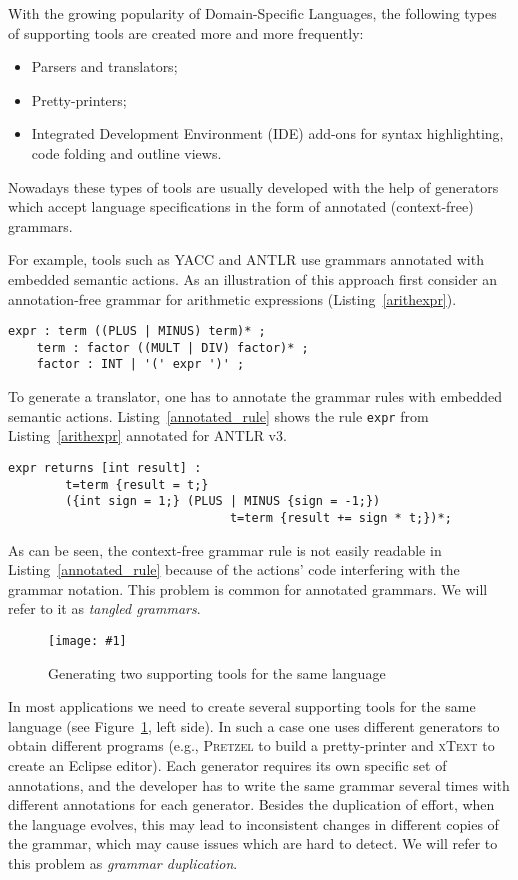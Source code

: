 \documentclass{IOS-Book-Article}     %
\newcommand{\bad}[1]{\textcolor{red}{#1}}
\renewcommand{\bad}[1]{#1}
\newcommand{\fig}[2]{%
\begin{figure}%
\centering%
\texttt{[image: \#1]}%
\caption{#2}\label{#1}%
\end{figure}%
}
\newcommand{\lstref}[1]{Listing~\ref{#1}}
\newcommand{\figref}[1]{Figure~\ref{#1}}
\newcommand{\tool}[1]{\textsc{#1}}
\begin{document}
With the growing popularity of Domain-Specific Languages, the following types of supporting tools are created \bad{more and} more frequently:
\begin{itemize}
	\item Parsers and translators;
	\item Pretty-printers;
	\item Integrated Development Environment (IDE) add-ons for syntax highlighting, code folding and outline views.
\end{itemize}
Nowadays these types of tools are usually developed with the help of generators which accept language specifications in the form of annotated (context-free) grammars. 

For example, tools such as \tool{YACC} \cite{YACC} and \tool{ANTLR} \cite{ANTLR} use grammars annotated with embedded semantic actions. As an illustration of this approach first consider an annotation-free grammar for arithmetic expressions (\lstref{arithexpr}).
\begin{lstlisting}[language=Grammatic,label=arithexpr,caption=Grammar for arithmetic expressions,float]
    expr : term ((PLUS | MINUS) term)* ;
    term : factor ((MULT | DIV) factor)* ;
    factor : INT | '(' expr ')' ;
\end{lstlisting}
To generate a translator, one has to annotate the grammar rules with embedded semantic actions. \lstref{annotated_rule} shows the rule \texttt{expr} from \lstref{arithexpr} annotated for \tool{ANTLR} v3.
\begin{lstlisting}[caption=Annotated grammar rule,label=annotated_rule,float]
    expr returns [int result] : 
        t=term {result = t;} 
        ({int sign = 1;} (PLUS | MINUS {sign = -1;}) 
                               t=term {result += sign * t;})*;
\end{lstlisting}

As can be seen, the context-free grammar rule is not easily readable in \lstref{annotated_rule} because of the actions' code interfering with the grammar notation. This problem is common for annotated grammars. We will refer to it as \emph{tangled grammars}.

\fig{problems_and_solution}{Generating two supporting tools for the same language}
In most applications we need to create several supporting tools for the same language (see \figref{problems_and_solution}, left side). 
In such a case one uses different generators to obtain different programs (e.g., \tool{Pretzel} \cite{Pretzel} to build a pretty-printer and \tool{xText} \cite{Xtext} to create an Eclipse editor). Each generator requires its own specific set of annotations, and the developer has to write the same grammar several times with different annotations for each generator. Besides the duplication of effort, when the language evolves, this may lead to inconsistent changes in different copies of the grammar, which may cause issues which are hard to detect. We will refer to this problem as \emph{grammar duplication}.
\end{document}
